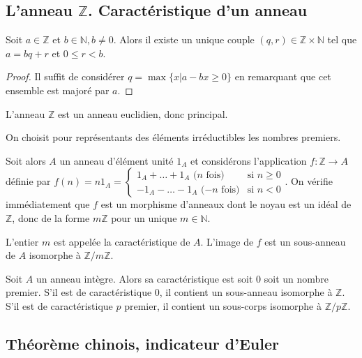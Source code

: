 \subsection{L'anneau $\mathbb{Z}$. Caractéristique d'un anneau}

\begin{thm}
Soit $a \in \mathbb{Z}$ et $b \in \mathbb{N}, b \neq 0$. Alors il existe un unique
couple $(q,r) \in \mathbb{Z} \times \mathbb{N}$ tel que $a = bq + r$ et $0 \leq r < b$.
\end{thm}

\begin{proof}
Il suffit de considérer $q = \max\{x | a - bx \geq 0\}$ en remarquant que cet ensemble est majoré par $a$.
\end{proof}

\begin{cor}
L'anneau $\mathbb{Z}$ est un anneau euclidien, donc principal.
\end{cor}

\begin{rem}
On choisit pour représentants des éléments irréductibles
les nombres premiers.
\end{rem}

Soit alors $A$ un anneau d'élément unité $1_A$ et considérons
l'application $f : \mathbb{Z} \rightarrow A$ définie par $f(n) = n1_A =
\begin{cases}
1_A + \ldots + 1_A \text{ ($n$ fois)} & \text{si } n \geq 0 \\
-1_A - \ldots - 1_A \text{ ($-n$ fois)} & \text{si } n < 0
\end{cases}$. On vérifie immédiatement que $f$ est un morphisme
d'anneaux dont le noyau est un idéal de $\mathbb{Z}$, donc de la forme $m\mathbb{Z}$ pour un
unique $m \in \mathbb{N}$.

\begin{de}
L'entier $m$ est appelée la caractéristique de $A$.
L'image de $f$ est un sous-anneau de $A$ isomorphe à $\mathbb{Z}/m\mathbb{Z}$.
\end{de}

\begin{prop}
Soit $A$ un anneau intègre. Alors sa caractéristique
est soit $0$ soit un nombre premier. S'il est de caractéristique $0$, il
contient un sous-anneau isomorphe à $\mathbb{Z}$. S'il est de caractéristique $p$
premier, il contient un sous-corps isomorphe à $\mathbb{Z}/p\mathbb{Z}$.
\end{prop}

\subsection{Théorème chinois, indicateur d'Euler}

